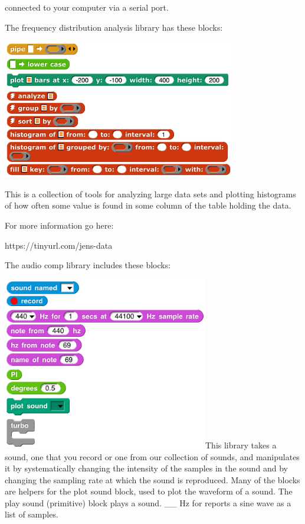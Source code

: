 connected to your computer via a serial port.

The frequency distribution analysis library has these blocks:

\includegraphics[width=4.02708in,height=2.39583in]{media/image469.png}

This is a collection of tools for analyzing large data sets and plotting
histograms of how often some value is found in some column of the table
holding the data.

For more information go here:

https://tinyurl.com/jens-data

The audio comp library includes these blocks:

\includegraphics[width=3.54167in,height=2.98125in]{media/image470.png}This
library takes a sound, one that you record or one from our collection of
sounds, and manipulates it by systematically changing the intensity of
the samples in the sound and by changing the sampling rate at which the
sound is reproduced. Many of the blocks are helpers for the plot sound
block, used to plot the waveform of a sound. The play sound (primitive)
block plays a sound. \_\_ Hz for reports a sine wave as a list of
samples.

